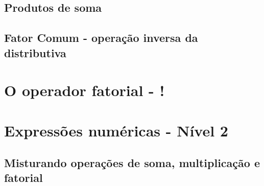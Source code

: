 \subsection{Produtos de soma}

\subsection{Fator Comum - operação inversa da distributiva}

\section{O operador fatorial - !}

\section{Expressões numéricas - Nível 2}

\subsection{Misturando operações de soma, multiplicação e fatorial}

